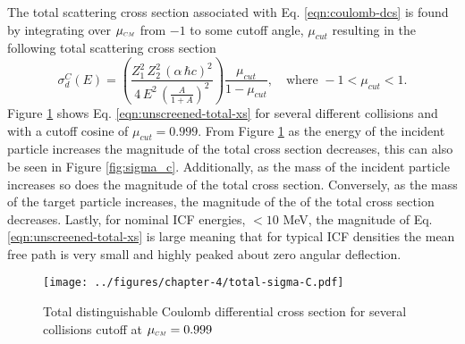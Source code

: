 The total scattering cross section associated with Eq. \eqref{eqn:coulomb-dcs} is found by integrating over $\mucm$ from $-1$ to some cutoff angle, $\mu_{cut}$ resulting in the following total scattering cross section
\begin{equation} \label{eqn:unscreened-total-xs}
    \sigma^C_d(E) = \left(\dfrac{Z_1^2 \, Z_2^2 \, \left(\alpha \, \hbar c\right)^2}{ 4 \, E^2 \, \left(\frac{A}{1 + A} \right)^2}\right) \dfrac{\mu_{cut}}{1-\mu_{cut}}, \quad \text{where} \,\, -1 < \mu_{cut} < 1.
\end{equation}
Figure \ref{fig:sigma_c_total} shows Eq. \eqref{eqn:unscreened-total-xs} for several different collisions and with a cutoff cosine of $\mu_{cut} = 0.999$. From Figure \ref{fig:sigma_c_total} as the energy of the incident particle increases the magnitude of the total cross section decreases, this can also be seen in Figure \ref{fig:sigma_c}. Additionally, as the mass of the incident particle increases so does the magnitude of the total cross section. Conversely, as the mass of the target particle increases, the magnitude of the of the total cross section decreases. Lastly, for nominal ICF energies, $<10$ MeV, the magnitude of Eq. \eqref{eqn:unscreened-total-xs} is large meaning that for typical ICF densities the mean free path is very small and highly peaked about zero angular deflection.
\begin{figure}[!htb]
    \centering
    \texttt{[image: ../figures/chapter-4/total-sigma-C.pdf]}
    \caption{Total distinguishable Coulomb differential cross section for several collisions cutoff at $\mucm = 0.999$}
    \label{fig:sigma_c_total}
\end{figure}

